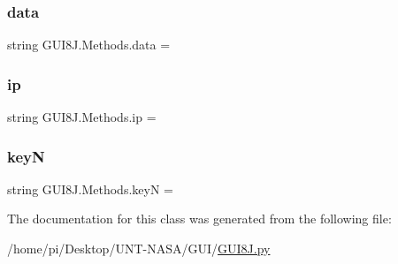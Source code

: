 \subsubsection{\texorpdfstring{data}{data}}
{\footnotesize\ttfamily string G\+U\+I8\+J.\+Methods.\+data = \textquotesingle{}\textquotesingle{}\hspace{0.3cm}{\ttfamily [static]}}

\mbox{\label{classGUI8J_1_1Methods_af8a350aa65fdbdc2a64b36b5e86dca74}} 
\subsubsection{\texorpdfstring{ip}{ip}}
{\footnotesize\ttfamily string G\+U\+I8\+J.\+Methods.\+ip = \textquotesingle{}\textquotesingle{}\hspace{0.3cm}{\ttfamily [static]}}

\mbox{\label{classGUI8J_1_1Methods_a28bf2c3a7818a8c36f162990c504c861}} 
\subsubsection{\texorpdfstring{keyN}{keyN}}
{\footnotesize\ttfamily string G\+U\+I8\+J.\+Methods.\+keyN = \textquotesingle{}\textquotesingle{}\hspace{0.3cm}{\ttfamily [static]}}



The documentation for this class was generated from the following file\+:\begin{DoxyCompactItemize}
\item 
/home/pi/\+Desktop/\+U\+N\+T-\/\+N\+A\+S\+A/\+G\+U\+I/\hyperlink{GUI8J_8py}{G\+U\+I8\+J.\+py}\end{DoxyCompactItemize}
